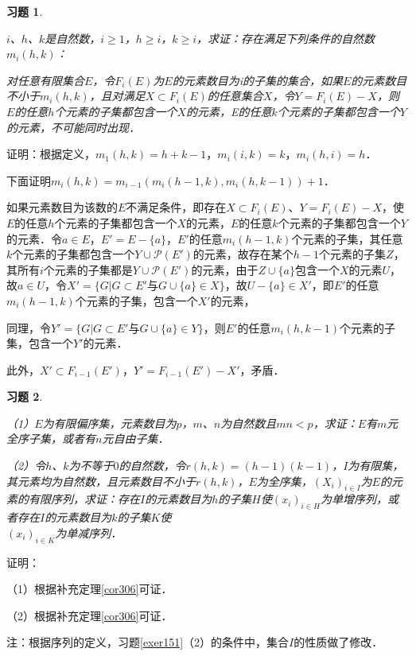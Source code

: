 \documentclass[12pt, a4paper, oneside]{book}
\newtheorem{exer}{习题}
\begin{document}
			\begin{exer}\label{exer154}
				\hfill\par
				$i$、$h$、$k$是自然数，$i\geq 1$，$h\geq i$，$k\geq i$，求证：存在满足下列条件的自然数$m_i(h, k)$：
				\par
				对任意有限集合$E$，令$F_i(E)$为$E$的元素数目为i的子集的集合，如果$E$的元素数目不小于$m_i(h, k)$，且对满足$X\subset F_i(E)$的任意集合$X$，令$Y= F_i(E)-X$，则$E$的任意$h$个元素的子集都包含一个$X$的元素，E的任意$k$个元素的子集都包含一个$Y$的元素，不可能同时出现．
			\end{exer}
			证明：根据定义，$m_1(h, k)=h+k-1$，$m_i(i, k)=k$，$m_i(h, i)=h$．
			\par
			下面证明$m_i(h, k)=m_{i-1}(m_i(h-1, k), m_i(h, k-1))+1$．
			\par
			如果元素数目为该数的$E$不满足条件，即存在$X\subset F_i(E)$、$Y= F_i(E)-X$，使$E$的任意$h$个元素的子集都包含一个$X$的元素，$E$的任意$k$个元素的子集都包含一个$Y$的元素．令$a\in E$，$E'=E-\{a\}$，$E'$的任意$m_i(h-1, k)$个元素的子集，其任意$k$个元素的子集都包含一个$Y\cup\mathcal{P}(E')$的元素，故存在某个$h-1$个元素的子集$Z$，其所有$i$个元素的子集都是$Y\cup\mathcal{P}(E')$的元素，由于$Z\cup\{a\}$包含一个$X$的元素$U$，故$a\in U$，令$X'=\{G|G\subset E'\text{与}G\cup\{a\}\in X\}$，故$U-\{a\}\in X'$，即$E'$的任意$m_i(h-1, k)$个元素的子集，包含一个$X'$的元素，
			\par
			同理，令$Y'=\{G|G\subset E'\text{与}G\cup\{a\}\in Y\}$，则$E'$的任意$m_i(h, k-1)$个元素的子集，包含一个$Y'$的元素．
			\par
			此外，$X'\subset F_{i-1}(E')$，$Y'=F_{i-1}(E')-X'$，矛盾．
				
			\begin{exer}\label{exer155}
				\hfill\par
				（1）$E$为有限偏序集，元素数目为$p$，$m$、$n$为自然数且$mn<p$，求证：$E$有$m$元全序子集，或者有$n$元自由子集．
				\par
				（2）令$h$、$k$为不等于$0$的自然数，令$r(h, k)=(h-1)(k-1)$，$I$为有限集，其元素均为自然数，且元素数目不小于$r(h, k)$，$E$为全序集，$(X_i)_{i\in I}$为$E$的元素的有限序列，求证：存在$I$的元素数目为$h$的子集$H$使$(x_i)_{i\in H}$为单增序列，或者存在$I$的元素数目为$k$的子集$K$使\\$(x_i)_{i\in K}$为单减序列．
			\end{exer}
			证明：
			\par
			（1）根据补充定理\ref{cor306}可证．
			\par
			（2）根据补充定理\ref{cor306}可证．
			\par
			注：根据序列的定义，习题\ref{exer151}（2）的条件中，集合$I$的性质做了修改．
\end{document}
